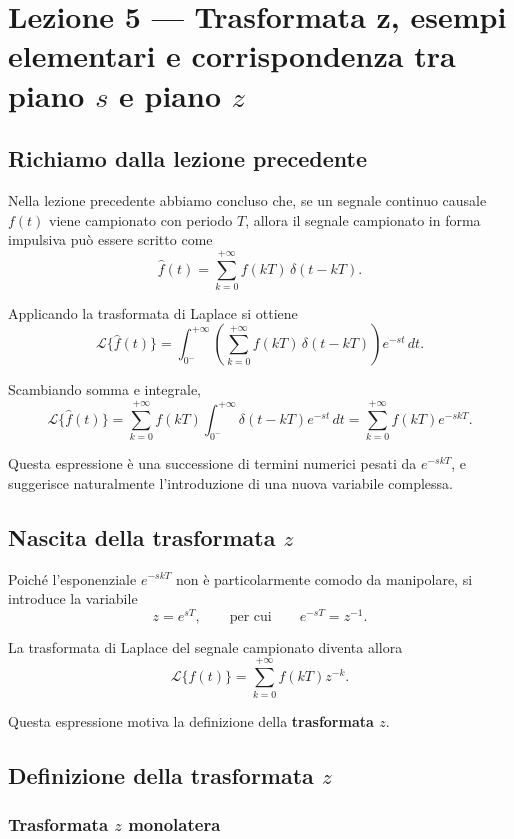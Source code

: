 \chapter{Lezione 5 --- Trasformata z, esempi elementari e corrispondenza tra piano \(s\) e piano \(z\)}

\section{Richiamo dalla lezione precedente}

Nella lezione precedente abbiamo concluso che, se un segnale continuo causale \(f(t)\)
viene campionato con periodo \(T\), allora il segnale campionato in forma impulsiva può essere scritto come
\[
\hat f(t)=\sum_{k=0}^{+\infty} f(kT)\,\delta(t-kT).
\]

Applicando la trasformata di Laplace si ottiene
\[
\mathcal{L}\{\hat f(t)\}
=
\int_{0^-}^{+\infty}
\left(
\sum_{k=0}^{+\infty} f(kT)\,\delta(t-kT)
\right)e^{-st}\,dt.
\]

Scambiando somma e integrale,
\[
\mathcal{L}\{\hat f(t)\}
=
\sum_{k=0}^{+\infty} f(kT)\int_{0^-}^{+\infty}\delta(t-kT)e^{-st}\,dt
=
\sum_{k=0}^{+\infty} f(kT)e^{-skT}.
\]

Questa espressione è una successione di termini numerici pesati da \(e^{-skT}\),
e suggerisce naturalmente l'introduzione di una nuova variabile complessa.

\section{Nascita della trasformata \(z\)}

Poiché l'esponenziale \(e^{-skT}\) non è particolarmente comodo da manipolare,
si introduce la variabile
\[
z=e^{sT},
\qquad\text{per cui}\qquad
e^{-sT}=z^{-1}.
\]

La trasformata di Laplace del segnale campionato diventa allora
\[
\mathcal{L}\{\hat f(t)\}
=
\sum_{k=0}^{+\infty} f(kT)z^{-k}.
\]

Questa espressione motiva la definizione della \textbf{trasformata \(z\)}.

\section{Definizione della trasformata \(z\)}

\subsection{Trasformata \(z\) monolatera}

